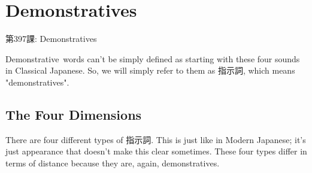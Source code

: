    
\chapter{Demonstratives}

\begin{center}
\begin{Large}
第397課: Demonstratives 
\end{Large}
\end{center}
 
\par{ Demonstrative words can't be simply defined as starting with these four sounds in Classical Japanese. So, we will simply refer to them as 指示詞, which means "demonstratives". }
      
\section{The Four Dimensions}
 
\par{There are four different types of 指示詞. This is just like in Modern Japanese; it's just appearance that doesn't make this clear sometimes. These four types differ in terms of distance because they are, again, demonstratives. }

